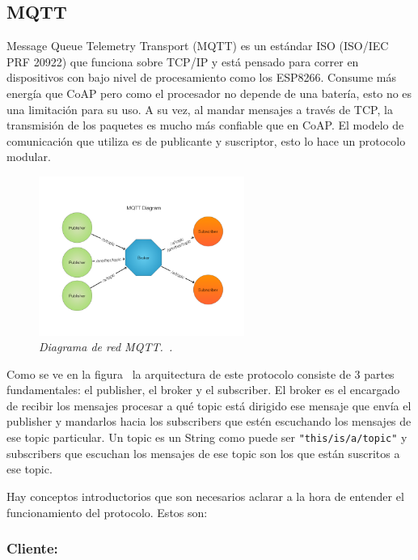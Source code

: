 \subsection{MQTT}

Message Queue Telemetry Transport (MQTT) es un estándar ISO (ISO/IEC PRF 20922) que funciona sobre TCP/IP y está pensado para correr en dispositivos con bajo nivel de procesamiento como los ESP8266. Consume más energía que CoAP pero como el procesador no depende de una batería, esto no es una limitación para su uso. A su vez, al mandar mensajes a través de TCP, la transmisión de los paquetes es mucho más confiable que en CoAP. El modelo de comunicación que utiliza es de publicante y suscriptor, esto lo hace un protocolo modular.

\begin{figure}[h!]
  \centering
  \includegraphics[width=0.6\textwidth, keepaspectratio]{images/mqtt-diagram}
  \caption{\textit{Diagrama de red MQTT.~\cite{MQTT_img}.}}
  \label{fig:mqtt-diag}
\end{figure}

Como se ve en la figura~ la arquitectura de este protocolo consiste de 3 partes fundamentales: el publisher, el broker y el subscriber. El broker es el encargado de recibir los mensajes procesar a qué topic está dirigido ese mensaje que envía el publisher y mandarlos hacia los subscribers que estén escuchando los mensajes de ese topic particular. Un topic es un String como puede ser \lstinline[columns=fixed]{"this/is/a/topic"} y subscribers que escuchan los mensajes de ese topic son los que están suscritos a ese topic.

Hay conceptos introductorios que son necesarios aclarar a la hora de entender el funcionamiento del protocolo. Estos son:

\subsubsection{Cliente:}


